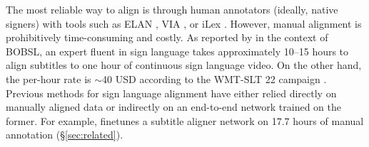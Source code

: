 \documentclass[11pt]{article}
\newcommand{\jyj}[1]{{\textcolor{purple}{[\textbf{jyj: #1}]}}} %
\begin{document}
The most reliable way to align is through human annotators (ideally, native signers) with tools such as ELAN \cite{wittenburg2006elan}, VIA \cite{dutta2019vgg}, or iLex \cite{hanke-2002-ilex}.
However, manual alignment is prohibitively time-consuming and costly.
As reported by \citet{bull2021aligning} in the context of BOBSL, an expert fluent in sign language takes approximately 10–15 hours to align subtitles to one hour of continuous sign language video. 
On the other hand, the per-hour rate is $\sim$40 USD according to the WMT-SLT 22 campaign \cite{muller-etal-2022-findings}.
Previous methods for sign language alignment have either relied directly on manually aligned data or indirectly on an end-to-end network trained on the former. 
For example, \citet{bull2021aligning} finetunes a subtitle aligner network on 17.7 hours of manual annotation (\S\ref{sec:related}).





\end{document}
